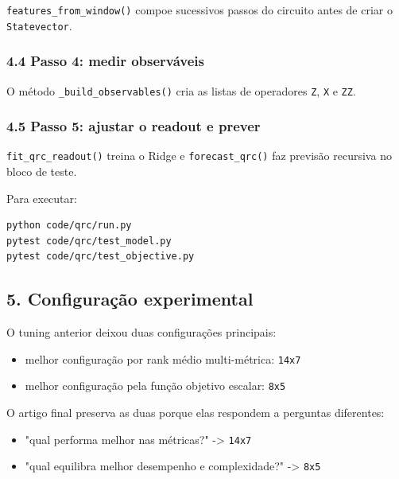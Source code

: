 \documentclass[12pt]{article}
\providecommand{\tightlist}{%
  \setlength{\itemsep}{0pt}\setlength{\parskip}{0pt}}
\begin{document}
\texttt{features\_from\_window()} compoe sucessivos passos do circuito antes de criar o \texttt{Statevector}.

\subsubsection{4.4 Passo 4: medir observáveis}\label{44-passo-4-medir-observuxe1veis}

O método \texttt{\_build\_observables()} cria as listas de operadores \texttt{Z}, \texttt{X} e \texttt{ZZ}.

\subsubsection{4.5 Passo 5: ajustar o readout e prever}\label{45-passo-5-ajustar-o-readout-e-prever}

\texttt{fit\_qrc\_readout()} treina o Ridge e \texttt{forecast\_qrc()} faz previsão recursiva no bloco de teste.

Para executar:

\begin{verbatim}
python code/qrc/run.py
pytest code/qrc/test_model.py
pytest code/qrc/test_objective.py
\end{verbatim}

\subsection{5. Configuração experimental}\label{5-configurauxe7uxe3o-experimental}

O tuning anterior deixou duas configurações principais:

\begin{itemize}
\tightlist
\item
  melhor configuração por rank médio multi-métrica: \texttt{14x7}
\item
  melhor configuração pela função objetivo escalar: \texttt{8x5}
\end{itemize}

O artigo final preserva as duas porque elas respondem a perguntas diferentes:

\begin{itemize}
\tightlist
\item
  "qual performa melhor nas métricas?" -\textgreater{} \texttt{14x7}
\item
  "qual equilibra melhor desempenho e complexidade?" -\textgreater{} \texttt{8x5}
\end{itemize}
\end{document}
